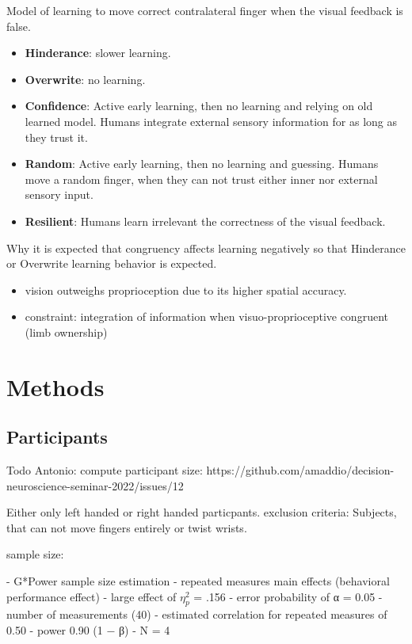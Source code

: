 \documentclass[man]{apa7}
\begin{document}
Model of learning to move correct contralateral finger when the visual feedback is false.
\begin{itemize}
    \item \textbf{Hinderance}: slower learning.
    \item \textbf{Overwrite}: no learning.
    \item \textbf{Confidence}: Active early learning, then no learning and relying on old learned model. Humans integrate external sensory information for as long as they trust it.
    \item \textbf{Random}: Active early learning, then no learning and guessing. Humans move a random finger, when they can not trust either inner nor external sensory input.
    \item \textbf{Resilient}: Humans learn irrelevant the correctness of the visual feedback.
\end{itemize}

Why it is expected that congruency affects learning negatively so that Hinderance or Overwrite learning behavior is expected.

\begin{itemize}
    \item vision outweighs proprioception due to its higher spatial accuracy.
    \item constraint: integration of information when visuo-proprioceptive congruent (limb ownership)
\end{itemize}

\parencite{Limanowski2016}


\section{Methods}
\subsection{Participants}
Todo Antonio: compute participant size: https://github.com/amaddio/decision-neuroscience-seminar-2022/issues/12

Either only left handed or right handed particpants.
exclusion criteria: Subjects, that can not move fingers entirely or twist wrists.

sample size:

- G*Power sample size estimation
- repeated measures main effects (behavioral performance effect)
- large effect of $\eta^2_p$ = .156
- error probability of α = 0.05
- number of measurements (40)
- estimated correlation for repeated measures of 0.50
- power 0.90 (1 − β)
- N = 4
\end{document}
